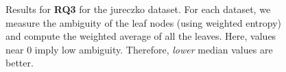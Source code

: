 \def\checkmark{\tikz\fill[scale=0.3](0,.35) -- (.25,0) -- (1,.7) -- (.25,.15) -- cycle;}
\begin{figure}[!h]
\centering
{}

\caption{Results for \textbf{RQ3} for the jureczko dataset. For each 
dataset, we measure the ambiguity of the leaf nodes (using weighted entropy) and compute the weighted average of all the leaves. Here, values near 0 imply low ambiguity. Therefore, \textit{lower} median values are better.}
\label{fig:rq3}
\end{figure}